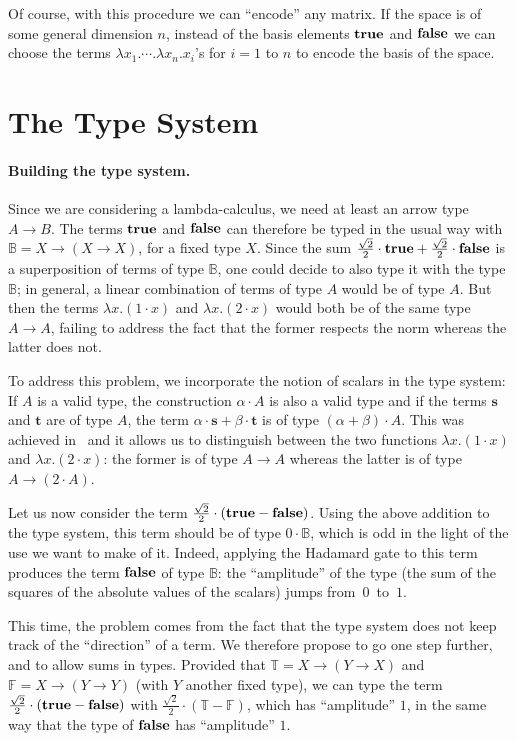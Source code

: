 \documentclass[colorlinks=true,linkcolor=black,urlcolor=black,citecolor=blue,submission,copyright,creativecommons]{eptcs}
\newcommand{\Bool}{\mathbb{B}}
\newcommand{\True}{\mathbb{T}}
\newcommand{\False}{\mathbb{F}}
\newcommand{\true}{{\bf true}}
\newcommand{\false}{{\bf false}}
\newcommand{\ve}[1]{\mathrm{\textbf{#1}}}
\begin{document}
Of course, with this procedure we can ``encode'' any matrix. If the
space is of some general dimension $n$, instead of the basis elements
$\true$ and $\false$ we can choose the terms $\lambda
x_1.\cdots.\lambda x_n.x_i$'s for $i=1$ to $n$ to encode the basis of
the space.

\section{The Type System}\label{sec:vectorial}

\paragraph{Building the type system.}
Since we are considering a lambda-calculus, we need at least an arrow
type $A\to B$. The terms $\true$ and $\false$ can therefore be typed
in the usual way with $\Bool = X\to(X\to X)$, for a fixed type $X$.
Since the sum ${\frac{\sqrt2}2}\cdot\true +
{\frac{\sqrt2}2}\cdot\false$ is a superposition of terms of type
$\Bool$, one could decide to also type it with the type $\Bool$; in
general, a linear combination of terms of type $A$ would be of type
$A$. But then the terms $\lambda x.(1\cdot x)$ and $\lambda
x.(2\cdot x)$ would both be of the same type $A\to A$, failing to
address the fact that the former respects the norm whereas the latter
does not.

To address this problem, we incorporate the notion of scalars in the
type system: If $A$ is a valid type, the construction $\alpha\cdot A$ is
also a valid type and if the terms $\ve{s}$ and $\ve{t}$ are of type
$A$, the term $\alpha\cdot\ve{s}+\beta\cdot\ve{t}$ is of type
$(\alpha+\beta)\cdot A$. This was achieved in~\cite{ArrighiDiazcaroQPL09} and it allows us to distinguish between
the two functions $\lambda x.(1\cdot x)$ and $\lambda x.(2\cdot x)$:
the former is of type $A\to A$ whereas the latter is of type $A\to
(2\cdot A)$.

Let us now consider the term $\frac{\sqrt2}2\cdot(\true-\false)$. Using
the above addition to the type system, this term should be of type
$0\cdot\Bool$, which is odd in the light of the use we want to
make of it. Indeed, applying the Hadamard gate to this term produces the term
$\false$ of type $\Bool$: the ``amplitude'' of the type (the sum of the squares of the absolute values of the scalars) jumps 
from~$0$~to~$1$.

This time, the problem comes from the fact that the type system does
not keep track of the ``direction'' of a term.  We therefore propose
to go one step further, and to allow sums in types. Provided that
$\True=X\to(Y\to X)$ and $\False=X\to(Y\to Y)$ (with $Y$ another fixed
type), we can type the term $\frac{\sqrt2}2\cdot(\true-\false)$ with
$\frac{\sqrt2}2\cdot(\True-\False)$, which has ``amplitude'' $1$, in the same way that the type of $\false$ has ``amplitude'' $1$.
\end{document}
